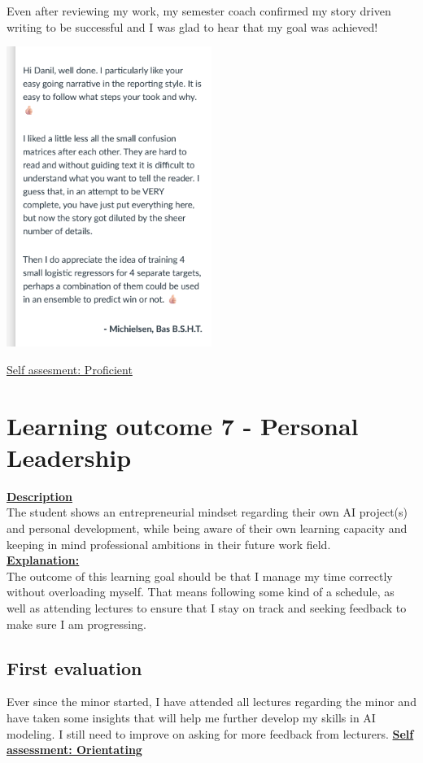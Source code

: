 \documentclass{article}
\begin{document}
\newpage
Even after reviewing my work, my semester coach confirmed my story driven writing to be successful and I was glad to hear that my goal was achieved!
\begin{center}
	\includegraphics[width=0.5\textwidth,keepaspectratio]{images/Bas_feedback_report.png}
\end{center}
\underline{Self assesment: Proficient}

\section{Learning outcome 7 - Personal Leadership}
\underline{\textbf{Description}}\\
The student shows an entrepreneurial mindset regarding their own AI project(s) and personal development, while being aware
of their own learning capacity and keeping in mind professional ambitions in their future work field.\\
\underline{\textbf{Explanation:}}\\
The outcome of this learning goal should be that I manage my time correctly without overloading myself. That means following some kind of a schedule, 
as well as attending lectures to ensure that I stay on track and seeking feedback to make sure I am progressing.

\subsection{First evaluation}
Ever since the minor started, I have attended all lectures regarding the minor and have taken some insights that will help me further develop my skills in AI modeling. 
I still need to improve on asking for more feedback from lecturers.
\underline{\textbf{Self assessment: Orientating}}
\end{document}
